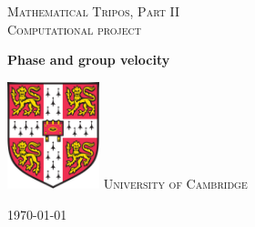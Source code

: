 \documentclass[a4paper,11pt]{article}
\begin{document}
\lstset{language = Matlab}
\begin{titlepage} %
	
	\center %
	
	\vspace*{3cm}

	\textsc{Mathematical Tripos, Part II}\\
	\textsc{Computational project}
	\begin{center}
      {\huge\bfseries Phase and group velocity\\[0.4cm]
}     \end{center}
	
	\vfill
	\vfill\vfill\vfill\vfill
	\includegraphics*[width = 2.675cm, height = 3.1cm]{coat.png}
	\vfill
    \textsc{University of Cambridge}
	
	\vspace*{\fill}
	\vfill
	{\large\today} 
	\vfill
	
\end{titlepage}
\setcounter{tocdepth}{3}
\tableofcontents
\newpage
\end{document}
